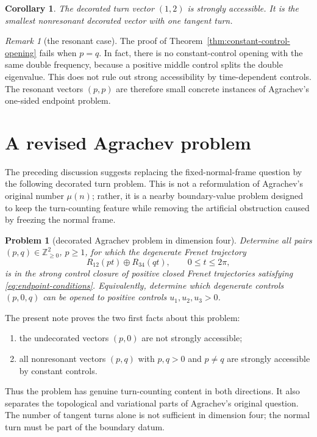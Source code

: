 \documentclass[11pt,reqno]{amsart}
\newtheorem{corollary}[theorem]{Corollary}
\newtheorem{problem}[theorem]{Problem}
\theoremstyle{definition}
\theoremstyle{remark}
\newtheorem{remark}[theorem]{Remark}
\begin{document}
\begin{corollary}\label{cor:first-one-turn}
The decorated turn vector $(1,2)$ is strongly accessible.  It is the smallest
nonresonant decorated vector with one tangent turn.
\end{corollary}

\begin{remark}[the resonant case]\label{rem:resonance}
The proof of Theorem~\ref{thm:constant-control-opening} fails when $p=q$.  In fact,
there is no constant-control opening with the same double frequency, because a
positive middle control splits the double eigenvalue.  This does not rule out
strong accessibility by time-dependent controls.  The resonant vectors $(p,p)$ are
therefore small concrete instances of Agrachev's one-sided endpoint problem.
\end{remark}

\section{A revised Agrachev problem}

The preceding discussion suggests replacing the fixed-normal-frame question by the
following decorated turn problem.  This is not a reformulation of Agrachev's original
number $\mu(n)$; rather, it is a nearby boundary-value problem designed to keep the
turn-counting feature while removing the artificial obstruction caused by freezing
the normal frame.

\begin{problem}[decorated Agrachev problem in dimension four]\label{prob:decorated-R4}
Determine all pairs $(p,q)\in\mathbb Z_{\ge0}^2$, $p\ge1$, for which the degenerate
Frenet trajectory
\[
        R_{12}(pt)\oplus R_{34}(qt),
        \qquad 0\le t\le2\pi,
\]
is in the strong control closure of positive closed Frenet trajectories satisfying
\eqref{eq:endpoint-conditions}.  Equivalently, determine which degenerate controls
$(p,0,q)$ can be opened to positive controls $u_1,u_2,u_3>0$.
\end{problem}

The present note proves the two first facts about this problem:
\begin{enumerate}[label=\textup{(\roman*)}]
\item the undecorated vectors $(p,0)$ are not strongly accessible;
\item all nonresonant vectors $(p,q)$ with $p,q>0$ and $p\ne q$ are strongly
accessible by constant controls.
\end{enumerate}
Thus the problem has genuine turn-counting content in both directions.  It also
separates the topological and variational parts of Agrachev's original question.  The
number of tangent turns alone is not sufficient in dimension four; the normal turn
must be part of the boundary datum.
\end{document}
